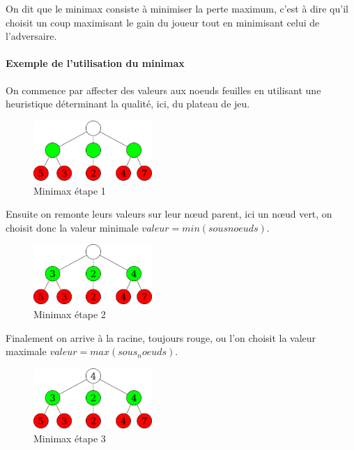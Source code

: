 		\vspace{1em}
		On dit que le minimax consiste à minimiser la perte maximum, c'est à dire qu'il choisit
		un coup maximisant le gain du joueur tout en minimisant celui de l'adversaire.

		\paragraph{Exemple de l'utilisation du minimax}
			On commence par affecter des valeurs aux noeuds feuilles en utilisant une heuristique
			déterminant la qualité, ici, du plateau de jeu.

			\begin{figure}[h]
				\centering
				\includegraphics[width=0.4\textwidth]{images/minimax_ex_1.png}
				\caption{Minimax étape 1}
				\label{fig:minimax_ex_1}
			\end{figure}

			Ensuite on remonte leurs valeurs sur leur n\oe{}ud parent, ici un n\oe{}ud vert,
			on choisit donc la valeur minimale $valeur = min(sous noeuds)$.

			\begin{figure}[h]
				\centering
				\includegraphics[width=0.4\textwidth]{images/minimax_ex_2.png}
				\caption{Minimax étape 2}
				\label{fig:minimax_ex_2}
			\end{figure}

			Finalement on arrive à la racine, toujours rouge, ou l'on choisit la
			valeur maximale $valeur = max(sous_noeuds)$.

			\begin{figure}[h]
				\centering
				\includegraphics[width=0.4\textwidth]{images/minimax_ex_3.png}
				\caption{Minimax étape 3}
				\label{fig:minimax_ex_3}
			\end{figure}

